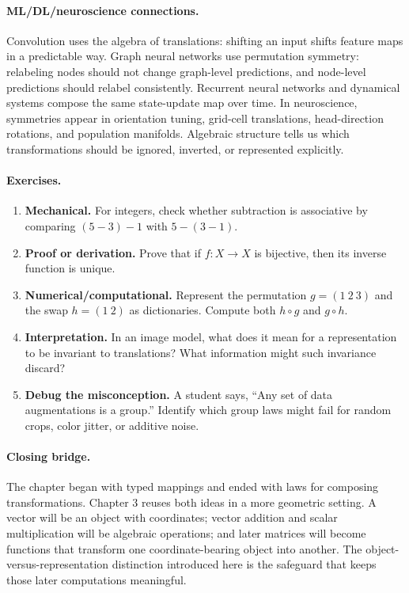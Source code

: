 \paragraph{ML/DL/neuroscience connections.}
Convolution uses the algebra of translations: shifting an input shifts feature maps in a predictable way. Graph neural networks use permutation symmetry: relabeling nodes should not change graph-level predictions, and node-level predictions should relabel consistently. Recurrent neural networks and dynamical systems compose the same state-update map over time. In neuroscience, symmetries appear in orientation tuning, grid-cell translations, head-direction rotations, and population manifolds. Algebraic structure tells us which transformations should be ignored, inverted, or represented explicitly.

\paragraph{Exercises.}
\begin{enumerate}[label=\textbf{2.4.\arabic*.}, leftmargin=*]
\item \textbf{Mechanical.} For integers, check whether subtraction is associative by comparing \((5-3)-1\) with \(5-(3-1)\).
\item \textbf{Proof or derivation.} Prove that if \(f:X\to X\) is bijective, then its inverse function is unique.
\item \textbf{Numerical/computational.} Represent the permutation \(g=(1\ 2\ 3)\) and the swap \(h=(1\ 2)\) as dictionaries. Compute both \(h\circ g\) and \(g\circ h\).
\item \textbf{Interpretation.} In an image model, what does it mean for a representation to be invariant to translations? What information might such invariance discard?
\item \textbf{Debug the misconception.} A student says, ``Any set of data augmentations is a group.'' Identify which group laws might fail for random crops, color jitter, or additive noise.
\end{enumerate}

\paragraph{Closing bridge.}
The chapter began with typed mappings and ended with laws for composing transformations. Chapter 3 reuses both ideas in a more geometric setting. A vector will be an object with coordinates; vector addition and scalar multiplication will be algebraic operations; and later matrices will become functions that transform one coordinate-bearing object into another. The object-versus-representation distinction introduced here is the safeguard that keeps those later computations meaningful.

\clearpage
